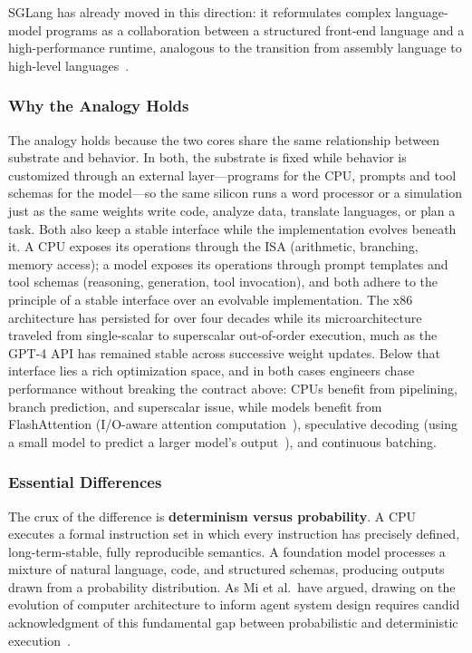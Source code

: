 SGLang has already moved in this direction: it reformulates complex language-model programs as a collaboration between a structured front-end language and a high-performance runtime, analogous to the transition from assembly language to high-level languages~\cite{sglang2024,sglang_docs_2026}.

\subsubsection{Why the Analogy Holds}

The analogy holds because the two cores share the same relationship between substrate and behavior.
In both, the substrate is fixed while behavior is customized through an external layer---programs for the CPU, prompts and tool schemas for the model---so the same silicon runs a word processor or a simulation just as the same weights write code, analyze data, translate languages, or plan a task.
Both also keep a stable interface while the implementation evolves beneath it.
A CPU exposes its operations through the ISA (arithmetic, branching, memory access); a model exposes its operations through prompt templates and tool schemas (reasoning, generation, tool invocation), and both adhere to the principle of a stable interface over an evolvable implementation.
The x86 architecture has persisted for over four decades while its microarchitecture traveled from single-scalar to superscalar out-of-order execution, much as the GPT-4 API has remained stable across successive weight updates.
Below that interface lies a rich optimization space, and in both cases engineers chase performance without breaking the contract above: CPUs benefit from pipelining, branch prediction, and superscalar issue, while models benefit from FlashAttention (I/O-aware attention computation~\cite{dao2022flashattention}), speculative decoding (using a small model to predict a larger model's output~\cite{leviathan2023speculative}), and continuous batching.

\subsubsection{Essential Differences}

The crux of the difference is \textbf{determinism versus probability}.
A CPU executes a formal instruction set in which every instruction has precisely defined, long-term-stable, fully reproducible semantics.
A foundation model processes a mixture of natural language, code, and structured schemas, producing outputs drawn from a probability distribution.
As Mi et al.\ have argued, drawing on the evolution of computer architecture to inform agent system design requires candid acknowledgment of this fundamental gap between probabilistic and deterministic execution~\cite{mi2025llmagentscomputersystems}.

